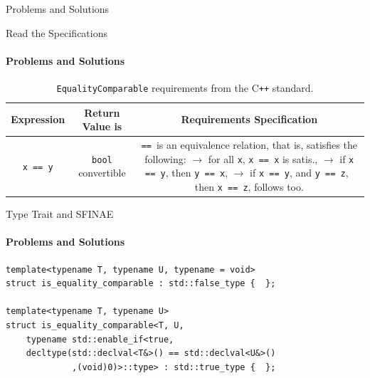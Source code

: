 \documentclass{beamer}
\begin{document}
    \begin{frame}[fragile]{Problems and Solutions}
    \end{frame}

    \begin{frame}[fragile]{Read the Specifications}
        \framesubtitle{Problems and Solutions}
        \begin{center}
        \begin{table}
        \begin{tabular}{ccc}
            \toprule
            \bf{Expression} & \bf{Return Value is} & \bf{Requirements Specification} \\
            \midrule
            \texttt{x == y} & \texttt{bool} convertible & \makecell[l]{\texttt{==}\, is an equivalence relation,\\
                                                                       that is, satisfies the following:\\
                                                                       $\rightarrow$ for all \texttt{x}, \texttt{x == x} is satis.,\\
                                                                       $\rightarrow$ if \texttt{x == y}, then \texttt{y == x},\\
                                                                       $\rightarrow$ if \texttt{x == y}, and\; \texttt{y == z},\\
                                                                       \;\;\;\, then \texttt{x == z}, follows too.
                                                                       } \\
            \bottomrule
        \end{tabular}
        \caption{\texttt{EqualityComparable} requirements from the C\texttt{++} standard.}
        \end{table}
        \end{center}
    \end{frame}

    \begin{frame}[fragile]{Type Trait and SFINAE}
        \framesubtitle{Problems and Solutions}
        \begin{center}
        \begin{lstlisting}[caption={expressing \texttt{EqualityComparable} as a SFINAE type trait.}]
template<typename T, typename U, typename = void>
struct is_equality_comparable : std::false_type {  };

template<typename T, typename U>
struct is_equality_comparable<T, U,
    typename std::enable_if<true,
    decltype(std::declval<T&>() == std::declval<U&>()
             ,(void)0)>::type> : std::true_type {  };\end{lstlisting}
        \end{center}
    \end{frame}
\end{document}

